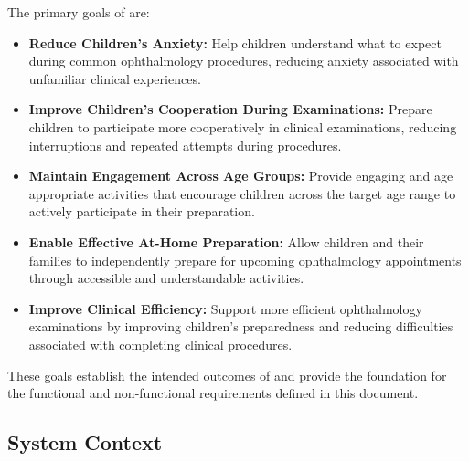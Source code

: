 \documentclass[12pt]{article}
\begin{document}
The primary goals of \progname{} are:

\begin{itemize}
    \item \textbf{Reduce Children's Anxiety:}
    Help children understand what to expect during common ophthalmology
    procedures, reducing anxiety associated with unfamiliar clinical
    experiences.

    \item \textbf{Improve Children's Cooperation During Examinations:}
    Prepare children to participate more cooperatively in clinical
    examinations, reducing interruptions and repeated attempts
    during procedures.

    \item \textbf{Maintain Engagement Across Age Groups:}
    Provide engaging and age appropriate activities that encourage
    children across the target age range to actively participate
    in their preparation.

    \item \textbf{Enable Effective At-Home Preparation:}
    Allow children and their families to independently prepare
    for upcoming ophthalmology appointments through accessible
    and understandable activities.

    \item \textbf{Improve Clinical Efficiency:}
    Support more efficient ophthalmology examinations by improving
    children's preparedness and reducing difficulties associated
    with completing clinical procedures.
\end{itemize}

These goals establish the intended outcomes of \progname{} and provide
the foundation for the functional and non-functional requirements
defined in this document.
  
\subsection{System Context}


\end{document}
